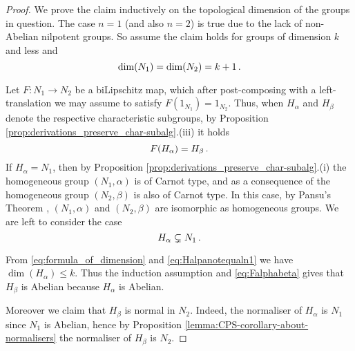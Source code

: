 \documentclass[a4paper,12pt]{amsart}
\theoremstyle{plain}
\theoremstyle{definition}
\theoremstyle{plain}
\theoremstyle{remark}
\begin{document}
\begin{proof}
	We prove the claim inductively on the topological dimension of the groups in question. 
	The case \( n=1 \) (and also \( n=2 \)) is true due to the lack of non-Abelian nilpotent groups. So assume the claim holds for groups of dimension \( k \) and less and 
	\begin{equation} \label{eq:formula_of_dimension}
	\dim(N_1) = \dim(N_2) =k+1 \,.
	\end{equation}
	
	Let \( F  \colon N_1 \to N_2  \) be a biLipschitz map, which after post-composing with a left-translation we may assume to satisfy \( F(1_{N_1}) = 1_{N_2} \). 
	Thus, when \( H_\alpha \) and \( H_\beta \) denote the respective characteristic subgroups,  by Proposition \ref{prop:derivations_preserve_char-subalg}.(iii) it holds 
	\begin{equation} \label{eq:Falphabeta}
	F ( H_\alpha) = H_\beta \,.
	\end{equation}
	If \(  H_\alpha = N_1 \), then by Proposition \ref{prop:derivations_preserve_char-subalg}.(i) 
	the homogeneous group \( (N_1, \alpha) \) is of Carnot type,
	and as a consequence of \cite[Theorem 1.9]{avain:carrasco-orlicz} the homogeneous group \( (N_2,\beta) \) is also of Carnot type. In this case, by Pansu's Theorem \cite{pansu}, \( (N_1, \alpha) \) and \( (N_2, \beta) \) are isomorphic as homogeneous groups.
	We are left to consider the case 
	\begin{equation} \label{eq:Halpanotequaln1}
	H_\alpha \subsetneq N_1 \,.
	\end{equation}
	
	
	From \eqref{eq:formula_of_dimension} and \eqref{eq:Halpanotequaln1} we have \( \dim(H_\alpha) \le k \).
	Thus the induction assumption and \eqref{eq:Falphabeta} gives that \(H_\beta \) is Abelian because \( H_\alpha \) is Abelian.
	
	Moreover we claim that \( H_\beta \) is normal in \( N_2 \). Indeed, the normaliser of \( H_\alpha \) is \( N_1 \) since \( N_1\) is Abelian, hence by	Proposition \ref{lemma:CPS-corollary-about-normalisers} the normaliser of \( H_\beta \) is \( N_2 \).
	

\end{proof}
\end{document}
